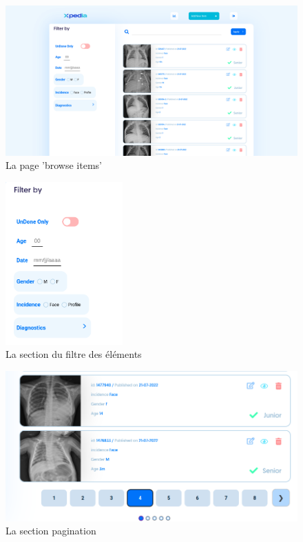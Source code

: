 \documentclass[12pt]{report}
\begin{document}
    \begin{figure}[H]
        \centering
        \includegraphics[width=\textwidth]{xpedia_browse_item.png}
        \caption{La page ’browse items’}\label{fig:xpedia_menu}
    \end{figure}
    \begin{figure}[H]
        \centering
        \includegraphics[width=0.4\textwidth]{xpedia_filter_section.png}
        \caption{La section du filtre des éléments}\label{fig:xpedia_filter_section}
    \end{figure}
    \begin{figure}[H]
        \centering
        \includegraphics[width=\textwidth]{xpedia_pagination.png}
        \caption{La section pagination}\label{fig:xpedia_menu}
    \end{figure}
    
\end{document}
